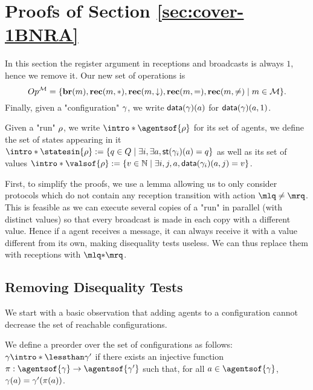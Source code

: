 
\section{Proofs of Section \ref{sec:cover-1BNRA}}
\label{app:cover-one-reg}

In this section the register argument in receptions and broadcasts is always $1$, hence we remove it.
Our new set of operations is 
\[
Op^{\mathcal{M}} = \{\textbf{br}(m), \textbf{rec}(m, {*}), \textbf{rec}(m, \downarrow), \textbf{rec}(m, {=}), \textbf{rec}(m, {\ne}) \mid m \in \mathcal{M}\}.
\]
Finally, given a "configuration" $\gamma$, we write $\mathsf{data}(\gamma)(a)$ for $\mathsf{data}(\gamma)(a,1)$. 

Given a "run" $\rho$, we write $\intro*\agentsof{\run}$ for its set of agents, we define the set of states appearing in it $\intro*\statesin{\run}:= \set{q \in Q \mid \exists i, \exists a, \st{\config_i}(a) = q}$  as well as its set of values $\intro*\valsof{\run} := \set{\aval \in \nats \mid \exists i,j, a, \data{\config_i}(a,j) = \aval}$.  

First, to simplify the proofs, we use a lemma allowing us to only consider protocols which do not contain any reception transition with action $\quotemarks{\ne}$. This is feasible as we can execute several copies of a "run" in parallel (with distinct values) so that every broadcast is made in each copy with a different value. Hence if a agent receives a message, it can always receive it with a value different from its own, making disequality tests useless. We can thus replace them with receptions with $\quotemarks{\dummyact}$. 




\subsection{Removing Disequality Tests}
\label{sec:one-diseq-tests}

We start with a basic observation that adding agents to a configuration cannot decrease the set of reachable configurations.


\begin{definition}
	We define a preorder over the set of configurations as follows: $\config \intro*\lessthan \config'$ if there exists an injective function $\pi: \agentsof{\config} \rightarrow \agentsof{\config'}$ such that, for all $a \in \agentsof{\config}$, $\gamma(a) = \gamma'(\pi(a))$. 
\end{definition}

